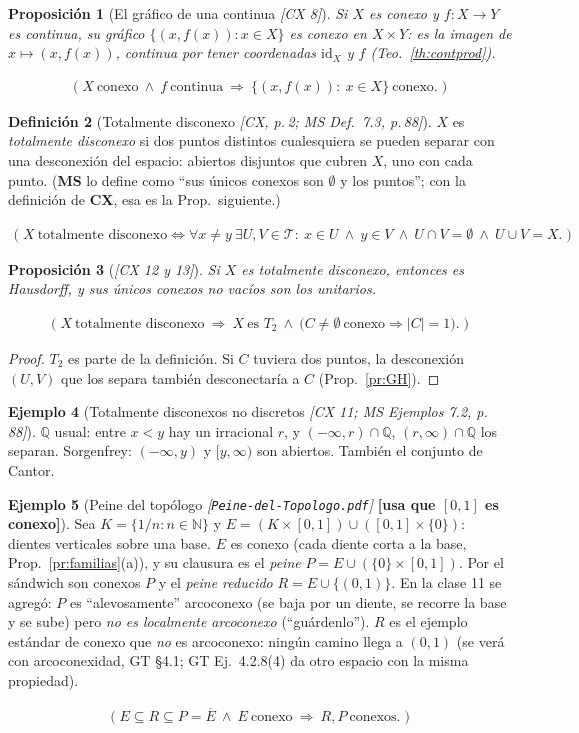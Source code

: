 \documentclass[11pt,a4paper]{article}
\newcommand{\noentra}[1]{{\normalfont\small\bfseries\color{red!55!black}[#1]}}
\newcommand{\lgc}[1]{\par\vspace{-3pt}\begin{gather*}\big(\;#1\;\big)\end{gather*}\vspace{-6pt}}
\theoremstyle{definition}
\newtheorem{definicion}{Definición}[section]
\newtheorem{ejemplo}[definicion]{Ejemplo}
\theoremstyle{plain}
\newtheorem{proposicion}[definicion]{Proposición}
\newcommand{\fnt}[1]{{\normalfont\small\itshape\color{gray!150!black}[#1]}}
\newcommand{\N}{\mathbb{N}}
\newcommand{\Q}{\mathbb{Q}}
\newcommand{\cl}[1]{\overline{#1}}
\newcommand{\tp}{\mathcal{T}}
\begin{document}
\begin{proposicion}[El gráfico de una continua \fnt{CX 8}]
Si $X$ es conexo y $f:X\to Y$ es continua, su gráfico $\{(x,f(x)): x\in X\}$ es conexo en $X\times Y$: es la imagen de $x\mapsto(x,f(x))$, continua por tener coordenadas $\mathrm{id}_X$ y $f$ (Teo.~\ref{th:contprod}).
\lgc{X\ \text{conexo}\ \wedge\ f\ \text{continua}\ \Rightarrow\ \{(x,f(x)):\ x\in X\}\ \text{conexo}.}
\end{proposicion}

\begin{definicion}[Totalmente disconexo \fnt{CX, p.\,2; MS Def.\ 7.3, p.\,88}]
$X$ es \emph{totalmente disconexo} si dos puntos distintos cualesquiera se pueden separar con una desconexión del espacio: abiertos disjuntos que cubren $X$, uno con cada punto. (\textbf{MS} lo define como ``sus únicos conexos son $\emptyset$ y los puntos''; con la definición de \textbf{CX}, esa es la Prop.\ siguiente.)
\lgc{X\ \text{totalmente disconexo}\iff \forall x\ne y\ \exists U,V\in\tp:\ x\in U\ \wedge\ y\in V\ \wedge\ U\cap V=\emptyset\ \wedge\ U\cup V=X.}
\end{definicion}

\begin{proposicion}[\fnt{CX 12 y 13}]
Si $X$ es totalmente disconexo, entonces es Hausdorff, y sus únicos conexos no vacíos son los unitarios.
\lgc{X\ \text{totalmente disconexo}\ \Rightarrow\ X\ \text{es } T_2\ \wedge\ \big(C\ne\emptyset\ \text{conexo}\Rightarrow |C|=1\big).}
\end{proposicion}

\begin{proof}
$T_2$ es parte de la definición. Si $C$ tuviera dos puntos, la desconexión $(U,V)$ que los separa también desconectaría a $C$ (Prop.~\ref{pr:GH}).
\end{proof}

\begin{ejemplo}[Totalmente disconexos no discretos \fnt{CX 11; MS Ejemplos 7.2, p.\,88}]
$\Q$ usual: entre $x<y$ hay un irracional $r$, y $(-\infty,r)\cap\Q$, $(r,\infty)\cap\Q$ los separan. Sorgenfrey: $(-\infty,y)$ y $[y,\infty)$ son abiertos. También el conjunto de Cantor.
\end{ejemplo}

\begin{ejemplo}[Peine del topólogo \fnt{\texttt{Peine-del-Topologo.pdf}} \noentra{usa que $[0,1]$ es conexo}]\label{ej:peine}
Sea $K=\{1/n: n\in\N\}$ y $E=(K\times[0,1])\cup([0,1]\times\{0\})$: dientes verticales sobre una base. $E$ es conexo (cada diente corta a la base, Prop.~\ref{pr:familias}(a)), y su clausura es el \emph{peine} $P=E\cup(\{0\}\times[0,1])$. Por el sándwich son conexos $P$ y el \emph{peine reducido} $R=E\cup\{(0,1)\}$. En la clase 11 se agregó: $P$ es ``alevosamente'' arcoconexo (se baja por un diente, se recorre la base y se sube) pero \emph{no es localmente arcoconexo} (``guárdenlo''). $R$ es el ejemplo estándar de conexo que \emph{no} es arcoconexo: ningún camino llega a $(0,1)$ (se verá con arcoconexidad, GT \S4.1; GT Ej.\ 4.2.8(4) da otro espacio con la misma propiedad).
\lgc{E\subseteq R\subseteq P=\cl E\ \wedge\ E\ \text{conexo}\ \Rightarrow\ R,P\ \text{conexos}.}
\end{ejemplo}
\end{document}
